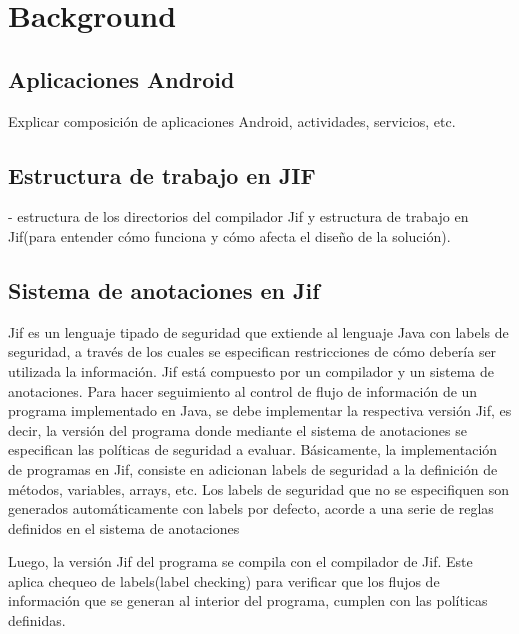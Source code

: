\section{Background}
\label{sec:back}

\subsection{Aplicaciones Android}
Explicar composición de aplicaciones Android, actividades, servicios, etc.

\subsection{Estructura de trabajo en JIF}
- estructura de los directorios del compilador Jif y estructura de trabajo en
Jif(para entender cómo funciona y cómo afecta el diseño de la
solución).

\subsection{Sistema de anotaciones en Jif}
Jif es un lenguaje tipado de seguridad que extiende al lenguaje Java con labels
de seguridad, a través de los cuales se especifican restricciones de cómo
debería ser utilizada la información.\newline 
Jif está compuesto por un compilador y un sistema de anotaciones.\newline
Para hacer seguimiento al control de flujo de información de un programa
implementado en Java, se debe implementar la respectiva versión Jif, es decir,
la versión del programa donde mediante el sistema de anotaciones se especifican
las políticas de seguridad a evaluar.\newline
Básicamente, la implementación de programas en Jif, consiste en adicionan labels
de seguridad a la definición de métodos, variables, arrays, etc. Los labels de
seguridad que no se especifiquen son generados automáticamente con labels por
defecto, acorde a una serie de reglas definidos en el sistema de anotaciones

Luego, la versión Jif del programa se compila con el compilador de Jif.
Este aplica chequeo de labels(label checking)\cite{jifRef} para verificar que
los flujos de información que se generan al interior del programa, cumplen con
las políticas definidas.

